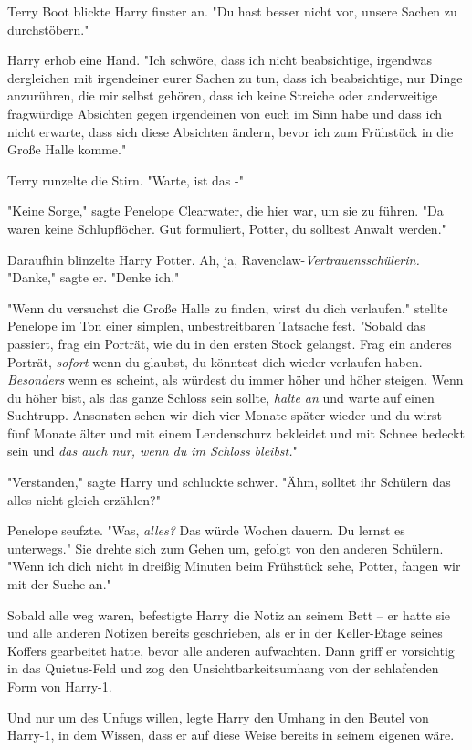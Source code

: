 {Terry Boot blickte Harry finster an. "Du hast besser nicht vor, unsere Sachen zu durchstöbern."

Harry erhob eine Hand. "Ich schwöre, dass ich nicht beabsichtige, irgendwas dergleichen mit irgendeiner eurer Sachen zu tun, dass ich beabsichtige, nur Dinge anzurühren, die mir selbst gehören, dass ich keine Streiche oder anderweitige fragwürdige Absichten gegen irgendeinen von euch im Sinn habe und dass ich nicht erwarte, dass sich diese Absichten ändern, bevor ich zum Frühstück in die Große Halle komme."

Terry runzelte die Stirn. "Warte, ist das -"

"Keine Sorge," sagte Penelope Clearwater, die hier war, um sie zu führen. "Da waren keine Schlupflöcher. Gut formuliert, Potter, du solltest Anwalt werden."

Daraufhin blinzelte Harry Potter. Ah, ja, Ravenclaw-\emph{Vertrauensschülerin.} "Danke," sagte er. "Denke ich."

"Wenn du versuchst die Große Halle zu finden, wirst du dich verlaufen." stellte Penelope im Ton einer simplen, unbestreitbaren Tatsache fest. "Sobald das passiert, frag ein Porträt, wie du in den ersten Stock gelangst. Frag ein anderes Porträt, \emph{sofort} wenn du glaubst, du könntest dich wieder verlaufen haben. \emph{Besonders} wenn es scheint, als würdest du immer höher und höher steigen. Wenn du höher bist, als das ganze Schloss sein sollte, \emph{halte an} und warte auf einen Suchtrupp. Ansonsten sehen wir dich vier Monate später wieder und du wirst fünf Monate älter und mit einem Lendenschurz bekleidet und mit Schnee bedeckt sein und \emph{das auch nur, wenn du im Schloss bleibst.}"

"Verstanden," sagte Harry und schluckte schwer. "Ähm, solltet ihr Schülern das alles nicht gleich erzählen?"

Penelope seufzte. "Was, \emph{alles?} Das würde Wochen dauern. Du lernst es unterwegs." Sie drehte sich zum Gehen um, gefolgt von den anderen Schülern. "Wenn ich dich nicht in dreißig Minuten beim Frühstück sehe, Potter, fangen wir mit der Suche an."

Sobald alle weg waren, befestigte Harry die Notiz an seinem Bett -- er hatte sie und alle anderen Notizen bereits geschrieben, als er in der Keller-Etage seines Koffers gearbeitet hatte, bevor alle anderen aufwachten. Dann griff er vorsichtig in das Quietus-Feld und zog den Unsichtbarkeitsumhang von der schlafenden Form von Harry-1.

Und nur um des Unfugs willen, legte Harry den Umhang in den Beutel von Harry-1, in dem Wissen, dass er auf diese Weise bereits in seinem eigenen wäre.

}
